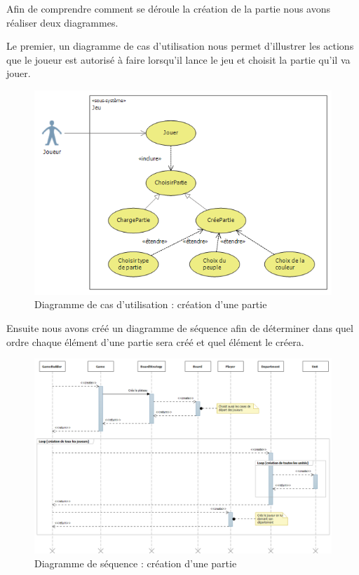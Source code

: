 Afin de comprendre comment se déroule la création de la partie nous avons réaliser deux diagrammes.

Le premier, un diagramme de cas d'utilisation nous permet d'illustrer les actions que le joueur est autorisé à faire lorsqu'il lance le jeu et choisit la partie qu'il va jouer.
\begin{figure}[!h]
\centering
\includegraphics[width=\textwidth]{Parties/Images/cdu_CreationPartie.png}
\caption{Diagramme de cas d'utilisation : création d'une partie}
\label{fig:cdu_CreationPartie}
\end{figure}

\newpage
Ensuite nous avons créé un diagramme de séquence afin de déterminer dans quel ordre chaque élément d'une partie sera créé et quel élément le créera.
\begin{figure}[!h]
\centering
\includegraphics[width=\textwidth]{Parties/Images/seq_CreationPartie.png}
\caption{Diagramme de séquence : création d'une partie}
\label{fig:seq_CreationPartie}
\end{figure}
